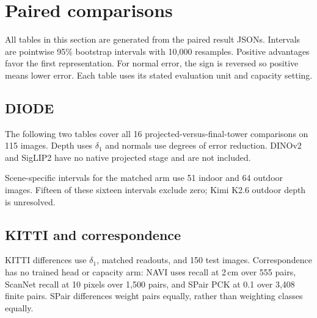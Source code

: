 \begin{table}[H]
\centering\small
\caption{Descriptive geometry peaks across both capacity arms. Depth scores and costs
are $\delta_1$; normal scores and costs are degrees.}
\label{tab:peaks}

\end{table}

\section{Paired comparisons}
\label{app:intervals}
All tables in this section are generated from the paired result JSONs. Intervals are
pointwise 95\% bootstrap intervals with 10,000 resamples. Positive advantages favor the
first representation. For normal error, the sign is reversed so positive means lower
error. Each table uses its stated evaluation unit and capacity setting.

\subsection{DIODE}
The following two tables cover all 16 projected-versus-final-tower comparisons on
115 images. Depth uses $\delta_1$ and normals use degrees of error reduction.
DINOv2 and SigLIP2 have no native projected stage and are not included.

\begin{table}[H]
\centering\small
\caption{DIODE projected-versus-tower differences, matched arm.}
\label{tab:projector}

\end{table}
\begin{table}[H]
\centering\small
\caption{DIODE projected-versus-tower differences, raw arm.}

\end{table}

Scene-specific intervals for the matched arm use 51 indoor and 64 outdoor images.
Fifteen of these sixteen intervals exclude zero; Kimi K2.6 outdoor depth is unresolved.

\begin{table}[H]
\centering\small
\caption{DIODE projected-versus-tower differences by scene, matched arm.}

\end{table}

\subsection{KITTI and correspondence}
KITTI differences use $\delta_1$, matched readouts, and 150 test images. Correspondence
has no trained head or capacity arm: NAVI uses recall at 2\,cm over 555 pairs, ScanNet
recall at 10 pixels over 1,500 pairs, and SPair PCK at 0.1 over 3,408 finite pairs.
SPair differences weight pairs equally, rather than weighting classes equally.

